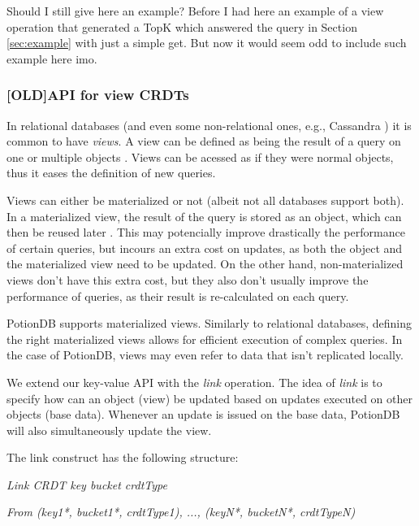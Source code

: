 \documentclass{vldb}
\newcommand{\grumbler}[2]{{\color{red}{\bf #1:} #2}}
\newcommand{\andre}[1]{\grumbler{andre}{#1}}
\newcommand{\emphvspace}{0.5\baselineskip}
\newcommand{\firstblockemph}[1]{\vspace{\emphvspace}\hspace{2em}\emph{#1}}
\newcommand{\middleblockemph}[1]{\hspace{2em}\emph{#1}}
\begin{document}
\andre{Should I still give here an example? Before I had here an example of a view operation that generated a TopK which answered the query in Section \ref{sec:example} with just a simple get. But now it would seem odd to include such example here imo.}

\subsubsection{[OLD]API for view CRDTs}
\label{subsubsec:OLDAPIView}

In relational databases (and even some non-relational ones, e.g., Cassandra \cite{???}) it is common to have \emph{views}. 
A view can be defined as being the result of a query on one or multiple objects \cite{???}.
Views can be acessed as if they were normal objects, thus it eases the definition of new queries.

Views can either be materialized or not (albeit not all databases support both). %
In a materialized view, the result of the query is stored as an object, which can then be reused later \cite{???}.
This may potencially improve drastically the performance of certain queries, but incours an extra cost on updates, as both the object and the materialized view need to be updated.
On the other hand, non-materialized views don't have this extra cost, but they also don't usually improve the performance of queries, as their result is re-calculated on each query.

PotionDB supports materialized views.
Similarly to relational databases, defining the right materialized views allows for efficient execution of complex queries.
In the case of PotionDB, views may even refer to data that isn't replicated locally.

We extend our key-value API with the \emph{link} operation.
The idea of \emph{link} is to specify how can an object (view) be updated based on updates executed on other objects (base data).
Whenever an update is issued on the base data, PotionDB will also simultaneously update the view.

The link construct has the following structure:

\firstblockemph{Link CRDT key bucket crdtType}

\middleblockemph{From (key1*, bucket1*, crdtType1), ..., (keyN*, bucketN*, crdtTypeN)}
\end{document}
